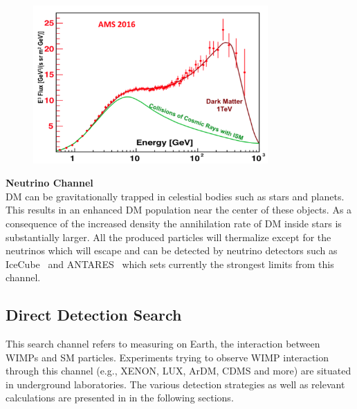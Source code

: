 \begin{figure}[]
	\centering
	\includegraphics[width=0.8\textwidth]{figs/AMS02.png}
	\label{fig:AMS}
\end{figure}  

\textbf{Neutrino Channel}\\

DM can be gravitationally trapped in celestial bodies such as stars and planets. This results in an enhanced DM population near the center of these objects. As a consequence of the increased density the annihilation rate of DM inside stars is substantially larger. All the produced particles will thermalize except for the neutrinos which will escape and can be detected by neutrino detectors such as IceCube~\cite{Achterberg:2006md} and ANTARES~\cite{Collaboration:2011nsa} which sets currently the strongest limits from this channel.

\subsection{Direct Detection Search}
\label{subsec:directdetection}

This search channel refers to measuring on Earth, the interaction between WIMPs and SM particles. Experiments trying to observe WIMP interaction through this channel (e.g., XENON, LUX, ArDM, CDMS and more) are situated in underground laboratories. The various detection strategies as well as relevant calculations are presented in in the following sections.

